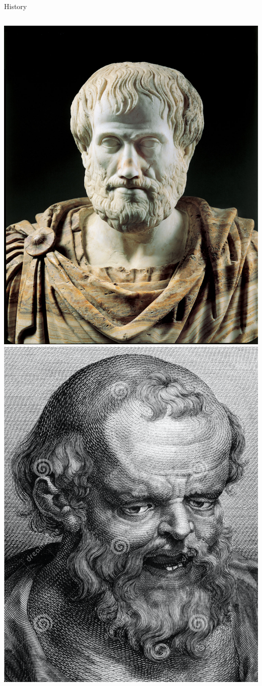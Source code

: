 \documentclass[10pt]{beamer}
\begin{document}
{\begin{frame}{History}
\begin{columns}
\begin{column}{0.16\textwidth}
            \includegraphics[scale=0.05]{figures/Aristotle.jpg}\\
            \includegraphics[scale=0.117]{figures/democritus.png}

\end{column}
\end{columns}
\end{frame}}
\end{document}
